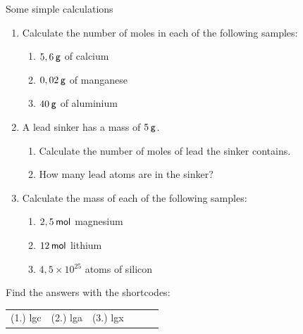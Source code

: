             \begin{exercises} {Some simple calculations}
            \nopagebreak
      \label{m38717*id278090}\begin{enumerate}[noitemsep, label=\textbf{\arabic*}. ] 
            \label{m38717*uid24}\item Calculate the number of moles in each of the following samples:
\label{m38717*id278106}\begin{enumerate}[noitemsep, label=\textbf{\alph*}. ] 
            \label{m38717*uid25}\item $5,6\phantom{\rule{2pt}{0ex}}\mathsf{g}$ of calcium
\label{m38717*uid26}\item $0,02\phantom{\rule{2pt}{0ex}}\mathsf{g}$ of manganese
\label{m38717*uid27}\item $40\phantom{\rule{2pt}{0ex}}\mathsf{g}$ of aluminium
\end{enumerate}
                \label{m38717*uid28}\item A lead sinker has a mass of $5\phantom{\rule{2pt}{0ex}}\mathsf{g}$.
\label{m38717*id278159}\begin{enumerate}[noitemsep, label=\textbf{\alph*}. ] 
            \label{m38717*uid29}\item Calculate the number of moles of lead the sinker contains.
\label{m38717*uid30}\item How many lead atoms are in the sinker?
\end{enumerate}
                \label{m38717*uid31}\item Calculate the mass of each of the following samples:
\label{m38717*id278201}\begin{enumerate}[noitemsep, label=\textbf{\alph*}. ] 
            \label{m38717*uid32}\item $2,5\phantom{\rule{2pt}{0ex}}\mathsf{mol}$ magnesium
\label{m38717*uid33}\item $12\phantom{\rule{2pt}{0ex}}\mathsf{mol}$ lithium
\label{m38717*uid34}\item $4,5\ensuremath{\times} 10{}^{25}$ atoms of silicon
\end{enumerate}
                \end{enumerate}
    \label{m38717*cid5}
\par {} Find the answers with the shortcodes:
 \par \begin{tabular}[h]{cccccc}
 (1.) lgc  &  (2.) lga  &  (3.) lgx  & \end{tabular}
\end{exercises}
